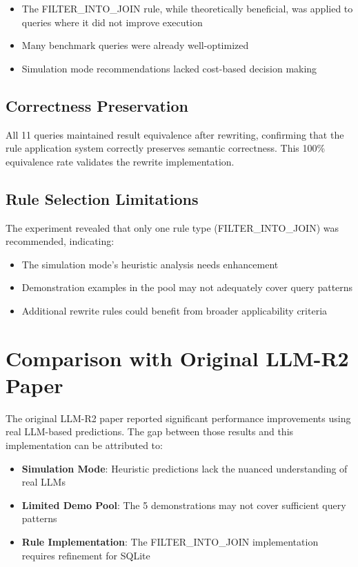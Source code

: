 \documentclass[12pt,a4paper]{article}
\begin{document}
\begin{itemize}
    \item The FILTER\_INTO\_JOIN rule, while theoretically beneficial, was applied to queries where it did not improve execution
    \item Many benchmark queries were already well-optimized
    \item Simulation mode recommendations lacked cost-based decision making
\end{itemize}

\subsection{Correctness Preservation}

All 11 queries maintained result equivalence after rewriting, confirming that the rule application system correctly preserves semantic correctness. This 100\% equivalence rate validates the rewrite implementation.

\subsection{Rule Selection Limitations}

The experiment revealed that only one rule type (FILTER\_INTO\_JOIN) was recommended, indicating:

\begin{itemize}
    \item The simulation mode's heuristic analysis needs enhancement
    \item Demonstration examples in the pool may not adequately cover query patterns
    \item Additional rewrite rules could benefit from broader applicability criteria
\end{itemize}

\section{Comparison with Original LLM-R2 Paper}

The original LLM-R2 paper reported significant performance improvements using real LLM-based predictions. The gap between those results and this implementation can be attributed to:

\begin{itemize}
    \item \textbf{Simulation Mode}: Heuristic predictions lack the nuanced understanding of real LLMs
    \item \textbf{Limited Demo Pool}: The 5 demonstrations may not cover sufficient query patterns
    \item \textbf{Rule Implementation}: The FILTER\_INTO\_JOIN implementation requires refinement for SQLite
\end{itemize}
\end{document}
